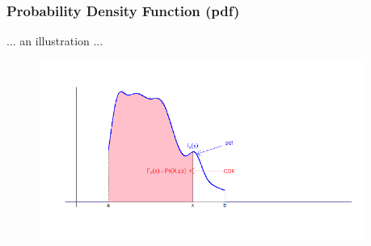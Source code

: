 \documentclass[notes=show,smaller,handout]{beamer}
\newenvironment{stepitemize}{\begin{itemize}[<+->]}{\end{itemize} }
\begin{document}
\begin{frame}%

\frametitle{Probability Density Function (pdf)}
 
 ... an illustration ...
 
\begin{figure}[ptb]\centering
\includegraphics[width=0.95\textwidth,height=0.75\textheight]{generic_CDF2.pdf}%
\end{figure}%

%

\end{frame}%
\end{document}
